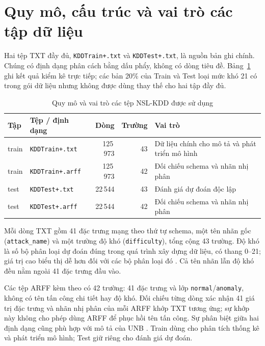 \documentclass[../main.tex]{subfiles}
\begin{document}
\section{Quy mô, cấu trúc và vai trò các tập dữ liệu}
Hai tệp TXT đầy đủ, \texttt{KDDTrain+.txt} và \texttt{KDDTest+.txt}, là nguồn bản ghi chính. Chúng có định dạng phân cách bằng dấu phẩy, không có dòng tiêu đề. Bảng~\ref{tab:chuong2:inventory} ghi kết quả kiểm kê trực tiếp; các bản 20\% của Train và Test loại mức khó 21 có trong gói dữ liệu nhưng không được dùng thay thế cho hai tập đầy đủ.
\begin{table}[H]\centering
\caption{Quy mô và vai trò các tệp NSL-KDD được sử dụng}
\label{tab:chuong2:inventory}
\small\setlength{\tabcolsep}{4pt}
\begin{tabular}{l>{\raggedright\arraybackslash}p{3.6cm}rr>{\raggedright\arraybackslash}p{5cm}}\toprule
Tập & Tệp / định dạng & Dòng & Trường & Vai trò\\\midrule
train & \texttt{KDDTrain+.txt} & 125\,973 & 43 & Dữ liệu chính cho mô tả và phát triển mô hình\\
train & \texttt{KDDTrain+.arff} & 125\,973 & 42 & Đối chiếu schema và nhãn nhị phân\\
test & \texttt{KDDTest+.txt} & 22\,544 & 43 & Đánh giá dự đoán độc lập\\
test & \texttt{KDDTest+.arff} & 22\,544 & 42 & Đối chiếu schema và nhãn nhị phân\\
\bottomrule\end{tabular}\end{table}
Mỗi dòng TXT gồm 41 đặc trưng mạng theo thứ tự schema, một tên nhãn gốc (\texttt{attack\_name}) và một trường độ khó (\texttt{difficulty}), tổng cộng 43 trường. Độ khó là số bộ phân loại dự đoán đúng trong quá trình xây dựng dữ liệu, có thang 0--21; giá trị cao biểu thị dễ hơn đối với các bộ phân loại đó \cite{task2_unb2009}. Cả tên nhãn lẫn độ khó đều nằm ngoài 41 đặc trưng đầu vào.

Các tệp ARFF kèm theo có 42 trường: 41 đặc trưng và lớp \texttt{normal}/\texttt{anomaly}, không có tên tấn công chi tiết hay độ khó. Đối chiếu từng dòng xác nhận 41 giá trị đặc trưng và nhãn nhị phân của mỗi ARFF khớp TXT tương ứng; sự khớp này không cho phép dùng ARFF để phục hồi tên tấn công. Sự phân biệt giữa hai định dạng cũng phù hợp với mô tả của UNB \cite{task2_unb2009}. Train dùng cho phân tích thống kê và phát triển mô hình; Test giữ riêng cho đánh giá dự đoán.
\end{document}
